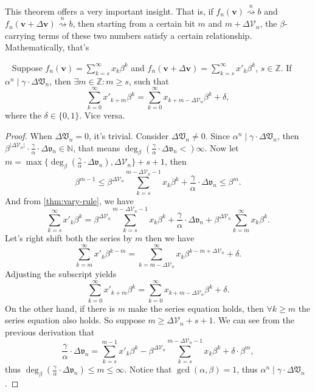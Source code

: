 This theorem offers a very important insight.
That is, if $f_{n}(\bm{v})\overset{n}{\rightsquigarrow} b$ and $f_{n}(\bm{v} + \Delta\bm{v}) \overset{n}{\rightsquigarrow} b$, then starting from a certain bit $m$ and $m + \Delta\mathcal{V}_n$, the $\beta$-carrying terms of these two numbers satisfy a certain relationship. Mathematically, that's
\begin{corollary}~\label{cor:high-order-bits-sync}
    Suppose $f_{n}(\bm{v}) = \sum_{k=s}^{\infty}x_k\beta^{k}$ and $f_{n}(\bm{v} + \Delta\bm{v}) = \sum_{k=s}^{\infty}x'_k\beta^{k}$, $s\in\mathbb{Z}$. If $\alpha^{n} \mid \gamma\cdot\Delta\mathfrak{V}_{n}$, then $\exists m \in \mathbb{Z}: m \ge s$, such that
    \[ \sum_{k=0}^{\infty}x'_{k + m}\beta^{k} = \sum_{k=0}^{\infty}x_{k + m - \Delta\mathcal{V}_n}\beta^{k} + \delta, \]
    where the $\delta\in\{0, 1\}$. Vice versa.
\end{corollary}
\begin{proof}
    When $\Delta\mathfrak{V}_{n} = 0$, it's trivial. Consider $\Delta\mathfrak{V}_{n} \ne 0$.\newline
    Since $\alpha^{n} \mid \gamma\cdot\Delta\mathfrak{V}_{n}$, then $\beta^{\vert\Delta\mathcal{V}_n\vert}\cdot\frac{\gamma}{\alpha}\cdot\Delta\mathfrak{v}_{n} \in \mathbb{N}$, that means $\deg_{\beta}(\frac{\gamma}{\alpha}\cdot\Delta\mathfrak{v}_{n}<)\infty$. Now let $m = \max\{\deg_{\beta}(\frac{\gamma}{\alpha}\cdot\Delta\mathfrak{v}_{n}), \Delta\mathcal{V}_n\} + s + 1$, then
    \[ \beta^{m - 1}\le\beta^{\Delta\mathcal{V}_n}\sum_{k=s}^{m - \Delta\mathcal{V}_n - 1}x_k\beta^{k} + \frac{\gamma}{\alpha}\cdot\Delta\mathfrak{v}_{n} \le \beta^{m}. \]
    And from \cref{thm:vary-rule}, we have
    \[ \sum_{k=s}^{\infty}x'_k\beta^{k} = \beta^{\Delta\mathcal{V}_n}\sum_{k=s}^{m - \Delta\mathcal{V}_n - 1}x_k\beta^{k} + \frac{\gamma}{\alpha}\cdot\Delta\mathfrak{v}_{n} + \beta^{\Delta\mathcal{V}_n}\sum_{k=m}^{\infty}x_{k}\beta^{k}. \]
    Let's right shift both the series by $m$ then we have
    \[ \sum_{k=m}^{\infty}x'_k\beta^{k - m} = \sum_{k=m - \Delta\mathcal{V}_n}^{\infty}x_{k}\beta^{k-m + \Delta\mathcal{V}_{n}} + \delta. \]
    Adjusting the subscript yields
    \[ \sum_{k=0}^{\infty}x'_{k + m}\beta^{k} = \sum_{k=0}^{\infty}x_{k + m - \Delta\mathcal{V}_n}\beta^{k} + \delta. \]
    On the other hand, if there is $m$ make the series equation holds, then $\forall k \ge m$ the series equation also holds. So suppose $m \ge \Delta\mathcal{V}_n + s + 1$. We can see from the previous derivation that
    \[\frac{\gamma}{\alpha}\cdot\Delta\mathfrak{v}_{n} = \sum_{k=s}^{m-1}x'_k\beta^{k} - \beta^{\Delta\mathcal{V}_n}\sum_{k=s}^{m - \Delta\mathcal{V}_n - 1}x_k\beta^{k} + \delta\cdot\beta^{m}, \]
    thus $\deg_{\beta}(\frac{\gamma}{\alpha}\cdot\Delta\mathfrak{v}_{n}) \le m \le\infty$. Notice that $\gcd(\alpha, \beta) = 1$, thus $\alpha^{n}\mid \gamma\cdot\Delta\mathfrak{V}_{n}$.
\end{proof}
